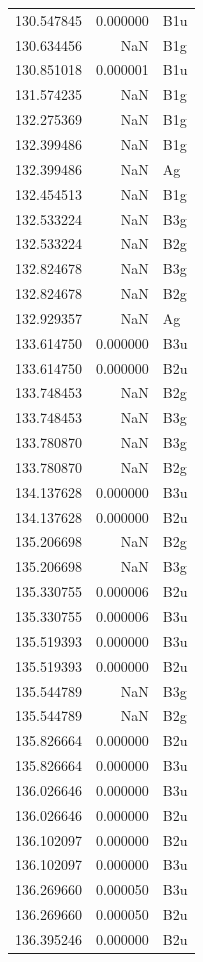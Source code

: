 \begin{longtable}{rrl}
130.547845 & 0.000000 & B1u \\
130.634456 & NaN & B1g \\
130.851018 & 0.000001 & B1u \\
131.574235 & NaN & B1g \\
132.275369 & NaN & B1g \\
132.399486 & NaN & B1g \\
132.399486 & NaN & Ag \\
132.454513 & NaN & B1g \\
132.533224 & NaN & B3g \\
132.533224 & NaN & B2g \\
132.824678 & NaN & B3g \\
132.824678 & NaN & B2g \\
132.929357 & NaN & Ag \\
133.614750 & 0.000000 & B3u \\
133.614750 & 0.000000 & B2u \\
133.748453 & NaN & B2g \\
133.748453 & NaN & B3g \\
133.780870 & NaN & B3g \\
133.780870 & NaN & B2g \\
134.137628 & 0.000000 & B3u \\
134.137628 & 0.000000 & B2u \\
135.206698 & NaN & B2g \\
135.206698 & NaN & B3g \\
135.330755 & 0.000006 & B2u \\
135.330755 & 0.000006 & B3u \\
135.519393 & 0.000000 & B3u \\
135.519393 & 0.000000 & B2u \\
135.544789 & NaN & B3g \\
135.544789 & NaN & B2g \\
135.826664 & 0.000000 & B2u \\
135.826664 & 0.000000 & B3u \\
136.026646 & 0.000000 & B3u \\
136.026646 & 0.000000 & B2u \\
136.102097 & 0.000000 & B2u \\
136.102097 & 0.000000 & B3u \\
136.269660 & 0.000050 & B3u \\
136.269660 & 0.000050 & B2u \\
136.395246 & 0.000000 & B2u \\

\end{longtable}
